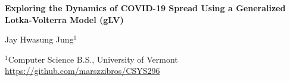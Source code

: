 \documentclass[12pt]{article}
\begin{document}
\baselineskip 12pt

\begin{center}
\textbf{\large Exploring the Dynamics of COVID-19 Spread Using a Generalized Lotka-Volterra Model (gLV)\\ } 

\vspace{1.5cc}
{ \sc Jay Hwasung Jung$^{1}$}\\

\vspace{0.3 cm}

{\small $^{1}$Computer Science B.S., University of Vermont  \\ \href{https://github.com/marszzibros/CSYS296}{https://github.com/marszzibros/CSYS296}
}

 \end{center}


\pagebreak


\pagebreak


\pagebreak


\pagebreak



\end{document}

